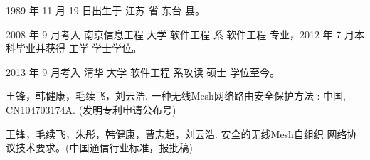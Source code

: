\begin{resume}


  1989 年 11 月 19 日出生于 江苏 省 东台 县。

  2008 年 9 月考入 南京信息工程 大学 软件工程 系 软件工程 专业，2012 年 7 月本科毕业并获得 工学 学士学位。

  2013 年 9 月考入 清华 大学 软件工程 系攻读 硕士 学位至今。

  \begin{achievements}
    \item 王锋，韩健康，毛续飞，刘云浩. 一种无线Mesh网络路由安全保护方法
        : 中国, CN104703174A. (发明专利申请公布号)
    \item 王锋，毛续飞，朱彤，韩健康，曹志超，刘云浩. 安全的无线Mesh自组织
        网络协议技术要求。(中国通信行业标准，报批稿)
  \end{achievements}

\end{resume}
